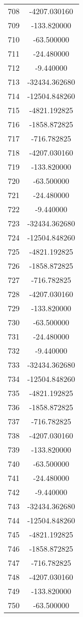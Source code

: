 \documentclass[12pt]{article}
\begin{document}
\begin{longtable}{@{}cc@{}}
708 & -4207.030160 \\
709 & -133.820000 \\
710 & -63.500000 \\
711 & -24.480000 \\
712 & -9.440000 \\
713 & -32434.362680 \\
714 & -12504.848260 \\
715 & -4821.192825 \\
716 & -1858.872825 \\
717 & -716.782825 \\
718 & -4207.030160 \\
719 & -133.820000 \\
720 & -63.500000 \\
721 & -24.480000 \\
722 & -9.440000 \\
723 & -32434.362680 \\
724 & -12504.848260 \\
725 & -4821.192825 \\
726 & -1858.872825 \\
727 & -716.782825 \\
728 & -4207.030160 \\
729 & -133.820000 \\
730 & -63.500000 \\
731 & -24.480000 \\
732 & -9.440000 \\
733 & -32434.362680 \\
734 & -12504.848260 \\
735 & -4821.192825 \\
736 & -1858.872825 \\
737 & -716.782825 \\
738 & -4207.030160 \\
739 & -133.820000 \\
740 & -63.500000 \\
741 & -24.480000 \\
742 & -9.440000 \\
743 & -32434.362680 \\
744 & -12504.848260 \\
745 & -4821.192825 \\
746 & -1858.872825 \\
747 & -716.782825 \\
748 & -4207.030160 \\
749 & -133.820000 \\
750 & -63.500000 \\

\end{longtable}
\end{document}
